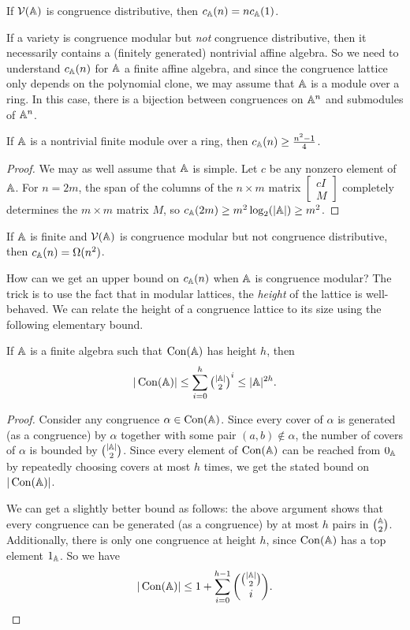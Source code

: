 \documentclass[letterpaper,11pt]{article}
\DeclareMathOperator{\Con}{Con}
\begin{document}
\begin{cor} If $\mathcal{V}(\mathbb{A})$ is congruence distributive, then $c_{\mathbb{A}}(n) = nc_{\mathbb{A}}(1)$.
\end{cor}

If a variety is congruence modular but \emph{not} congruence distributive, then it necessarily contains a (finitely generated) nontrivial affine algebra. So we need to understand $c_{\mathbb{A}}(n)$ for $\mathbb{A}$ a finite affine algebra, and since the congruence lattice only depends on the polynomial clone, we may assume that $\mathbb{A}$ is a module over a ring. In this case, there is a bijection between congruences on $\mathbb{A}^n$ and submodules of $\mathbb{A}^n$.

\begin{prop} If $\mathbb{A}$ is a nontrivial finite module over a ring, then $c_{\mathbb{A}}(n) \ge \frac{n^2-1}{4}$.
\end{prop}
\begin{proof} We may as well assume that $\mathbb{A}$ is simple. Let $c$ be any nonzero element of $\mathbb{A}$. For $n = 2m$, the span of the columns of the $n\times m$ matrix $\begin{bmatrix} cI\\ M\end{bmatrix}$ completely determines the $m \times m$ matrix $M$, so $c_{\mathbb{A}}(2m) \ge m^2\log_2(|\mathbb{A}|) \ge m^2$.
\end{proof}

\begin{cor} If $\mathbb{A}$ is finite and $\mathcal{V}(\mathbb{A})$ is congruence modular but not congruence distributive, then $c_{\mathbb{A}}(n) = \Omega(n^2)$.
\end{cor}

How can we get an upper bound on $c_{\mathbb{A}}(n)$ when $\mathbb{A}$ is congruence modular? The trick is to use the fact that in modular lattices, the \emph{height} of the lattice is well-behaved. We can relate the height of a congruence lattice to its size using the following elementary bound.

\begin{prop} If $\mathbb{A}$ is a finite algebra such that $\Con(\bA)$ has height $h$, then
\[
|\Con(\bA)| \le \sum_{i = 0}^h \tbinom{|\bA|}{2}^i \le |\bA|^{2h}.
\]
\end{prop}
\begin{proof} Consider any congruence $\alpha \in \Con(\bA)$. Since every cover of $\alpha$ is generated (as a congruence) by $\alpha$ together with some pair $(a,b) \not\in \alpha$, the number of covers of $\alpha$ is bounded by $\binom{|\mathbb{A}|}{2}$. Since every element of $\Con(\bA)$ can be reached from $0_{\mathbb{A}}$ by repeatedly choosing covers at most $h$ times, we get the stated bound on $|\Con(\bA)|$.

We can get a slightly better bound as follows: the above argument shows that every congruence can be generated (as a congruence) by at most $h$ pairs in $\binom{\mathbb{A}}{2}$. Additionally, there is only one congruence at height $h$, since $\Con(\bA)$ has a top element $1_{\mathbb{A}}$. So we have
\[
|\Con(\bA)| \le 1 + \sum_{i = 0}^{h-1} \binom{\binom{|\bA|}{2}}{i}.\qedhere
\]
\end{proof}
\end{document}
